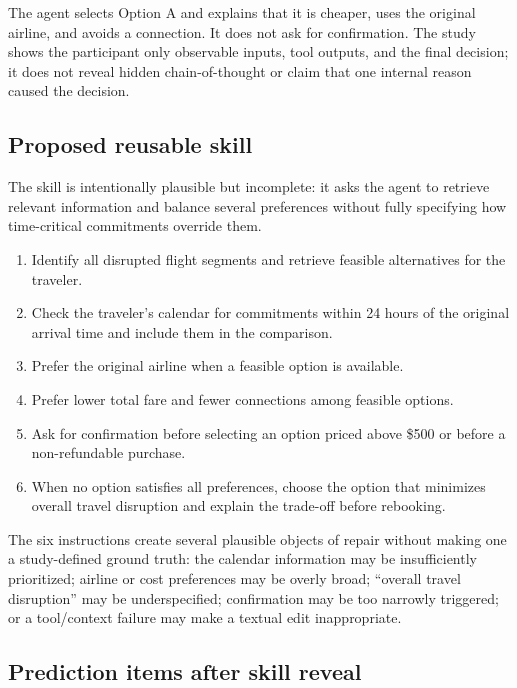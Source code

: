 The agent selects Option A and explains that it is cheaper, uses the original
airline, and avoids a connection. It does not ask for confirmation. The study
shows the participant only observable inputs, tool outputs, and the final
decision; it does not reveal hidden chain-of-thought or claim that one internal
reason caused the decision.

\subsection{Proposed reusable skill}
\label{app:scenario-skill}

The skill is intentionally plausible but incomplete: it asks the agent to
retrieve relevant information and balance several preferences without fully
specifying how time-critical commitments override them.

\begin{enumerate}[leftmargin=*]
    \item Identify all disrupted flight segments and retrieve feasible
    alternatives for the traveler.
    \item Check the traveler's calendar for commitments within 24 hours of the
    original arrival time and include them in the comparison.
    \item Prefer the original airline when a feasible option is available.
    \item Prefer lower total fare and fewer connections among feasible options.
    \item Ask for confirmation before selecting an option priced above \$500 or
    before a non-refundable purchase.
    \item When no option satisfies all preferences, choose the option that
    minimizes overall travel disruption and explain the trade-off before
    rebooking.
\end{enumerate}

The six instructions create several plausible objects of repair without making
one a study-defined ground truth: the calendar information may be insufficiently
prioritized; airline or cost preferences may be overly broad; ``overall
travel disruption'' may be underspecified; confirmation may be too narrowly
triggered; or a tool/context failure may make a textual edit inappropriate.

\subsection{Prediction items after skill reveal}
\label{app:prediction-items}

